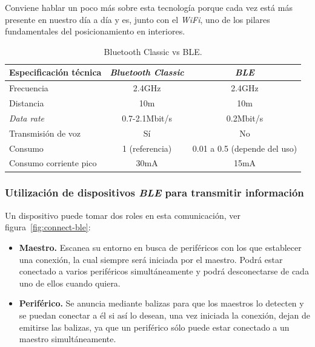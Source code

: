 Conviene hablar un poco más sobre esta tecnología porque cada vez está más presente en nuestro día a día y es, junto con el \textit{WiFi}, uno de los pilares fundamentales del posicionamiento en interiores.

\begin{table}[tbp]
\begin{center}
\small
\begin{tabular}{|l|c|c|}
\hline 
Especificación técnica & \textit{Bluetooth Classic} & \textit{BLE}  \\
\hline 
\hline
Frecuencia & 2.4GHz & 2.4GHz \\
\hline
Distancia & 10m & 10m \\
\hline
\textit{Data rate} & 0.7-2.1Mbit/s & 0.2Mbit/s \\
\hline
Transmisión de voz & Sí & No \\ 
\hline
Consumo & 1 (referencia) & 0.01 a 0.5 (depende del uso) \\
\hline
Consumo corriente pico & 30mA & 15mA \\
\hline
\end{tabular}
\caption{Bluetooth Classic vs BLE.\label{tab:bluetooth_ble}}
\end{center}
\end{table}

\subsubsection{Utilización de dispositivos \textit{BLE} para transmitir información}
Un dispositivo puede tomar dos roles en esta comunicación, ver figura~\ref{fig:connect-ble}:
\begin{itemize}
\item \textbf{Maestro.} Escanea su entorno en busca de periféricos con los que establecer una conexión, la cual siempre será iniciada por el maestro. Podrá estar conectado a varios periféricos simultáneamente y podrá desconectarse de cada uno de ellos cuando quiera.
\item \textbf{Periférico.} Se anuncia mediante balizas para que los maestros lo detecten y se puedan conectar a él si así lo desean, una vez iniciada la conexión, dejan de emitirse las balizas, ya que un periférico sólo puede estar conectado a un maestro simultáneamente.
\end{itemize}

